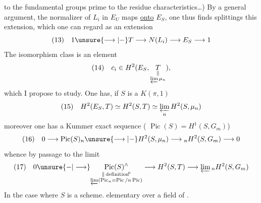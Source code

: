 to the fundamental groups prime to the residue characteristics\dots) By a general argument, the normalizer of $L_i$ in $E_U$ maps \uline{onto} $E_S$, one thus finds splittings  this extension, which one can regard as an extension
\[
(13)\quad 1\unsure{\longrightarrow|-}T\longrightarrow N(L_i)\longrightarrow E_S\longrightarrow1
\]
The isomorphism class is an element 
\[
(14)\quad c_i\in H^2(E_S,\underset{\substack{\Vert\\\varprojlim\mu_n}}{T}),
\]
which I propose to study. One has, if $S$ is a $K(\pi,1)$
\[
(15)\quad H^2(E_S,T)\simeq H^2(S,T)\simeq\varprojlim_n H^2(S,\mu_n)
\]
moreover one has a Kummer exact sequence ( $\operatorname{Pic}(S)=H^1(S,G_m)$)
\[
(16)\quad 0\longrightarrow\operatorname{Pic}(S)_n\unsure{\longrightarrow|-} H^2(S,\mu_n)\longrightarrow {}_nH^2(S,G_m)\longrightarrow0
\]
whence by passage to the limit
\[
(17)\quad 0\unsure{-|\longrightarrow}
\underset{\substack{\Vert\,\text{definition}\!^{\mathrm n}\\\varprojlim(\operatorname{Pic}_n=\operatorname{Pic}/n\operatorname{Pic})}}{\operatorname{Pic}(S)^\wedge}
\longrightarrow H^2(S,T)\longrightarrow\varprojlim {}_nH^2(S,G_m)
\]
In the case where $S$ is a scheme. elementary over a field of . 
